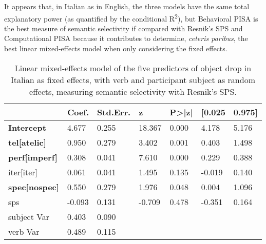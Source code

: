 It appears that, in Italian as in English, the three models have the same total explanatory power (as quantified by the conditional R\textsuperscript{2}), but Behavioral PISA is the best measure of semantic selectivity if compared with Resnik's SPS and Computational PISA because it contributes to determine, \textit{ceteris paribus}, the best linear mixed-effects model when only considering the fixed effects.

\begin{table}[htb] %
\caption{Linear mixed-effects model of the five predictors of object drop in Italian as fixed effects, with verb and participant subject as random effects, measuring semantic selectivity with Resnik's SPS.}
\begin{tabular}{l|llllll}
                         & Coef. & Std.Err. & z      & P\textgreater{}|z| & {[}0.025 & 0.975{]} \\
\hline                         
\textbf{Intercept}                & 4.677  & 0.255    & 18.367 & 0.000              & 4.178    & 5.176    \\
\textbf{tel{[}atelic{]}}     & 0.950  & 0.279    & 3.402  & 0.001              & 0.403    & 1.498    \\
\textbf{perf{[}imperf{]}} & 0.308  & 0.041    & 7.610  & 0.000              & 0.229    & 0.388    \\
iter{[}iter{]}    & 0.061  & 0.041    & 1.495  & 0.135              & -0.019   & 0.140    \\
\textbf{spec{[}nospec{]}}     & 0.550  & 0.279    & 1.976  & 0.048              & 0.004    & 1.096    \\
sps                      & -0.093 & 0.131    & -0.709 & 0.478              & -0.351   & 0.164    \\
subject Var              & 0.403  & 0.090     &        &                    &          &          \\
verb Var                 & 0.489  & 0.115    &        &                    &          &         
\end{tabular}
\end{table}

